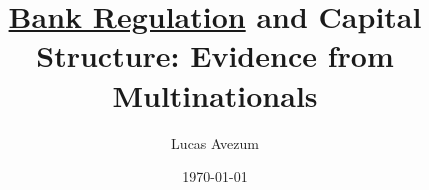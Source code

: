 \documentclass[12pt]{article}
\begin{document}
	
		\title{\underline{Bank Regulation} and Capital Structure: Evidence from Multinationals}
		\author{Lucas Avezum}
		\date{\today}
		\maketitle
			
	
	
	
	
	\doublespacing
	
\normalem

	 
\end{document}
